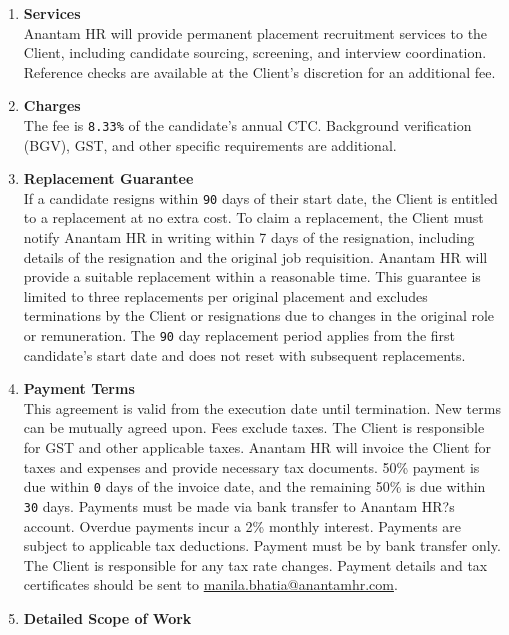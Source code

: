 \documentclass{article}
\begin{document}
\begin{enumerate}[label=\arabic{enumi}.]
    \item \textbf{Services}\\
        Anantam HR will provide permanent placement recruitment services to the Client, including candidate sourcing, screening, and interview coordination. Reference checks are available at the Client's discretion for an additional fee.
    \item \textbf{Charges}\\
        The fee is \texttt{8.33\%} of the candidate's annual CTC. Background verification (BGV), GST, and other specific requirements are additional.
    \item \textbf{Replacement Guarantee}\\
        If a candidate resigns within \texttt{90} days of their start date, the Client is entitled to a replacement at no extra cost. To claim a replacement, the Client must notify Anantam HR in writing within 7 days of the resignation, including details of the resignation and the original job requisition. Anantam HR will provide a suitable replacement within a reasonable time. This guarantee is limited to three replacements per original placement and excludes terminations by the Client or resignations due to changes in the original role or remuneration. The \texttt{90} day replacement period applies from the first candidate's start date and does not reset with subsequent replacements.
    \item \textbf{Payment Terms}\\
        This agreement is valid from the execution date until termination. New terms can be mutually agreed upon. Fees exclude taxes. The Client is responsible for GST and other applicable taxes. Anantam HR will invoice the Client for taxes and expenses and provide necessary tax documents. 50\% payment is due within \texttt{0} days of the invoice date, and the remaining 50\% is due within \texttt{30} days. Payments must be made via bank transfer to Anantam HR?s account. Overdue payments incur a 2\% monthly interest. Payments are subject to applicable tax deductions. Payment must be by bank transfer only. The Client is responsible for any tax rate changes. Payment details and tax certificates should be sent to \href{mailto:[manila.bhatia@anantamhr.com]}{manila.bhatia@anantamhr.com}.
    \item \textbf{Detailed Scope of Work}\\

\end{enumerate}
\end{document}

